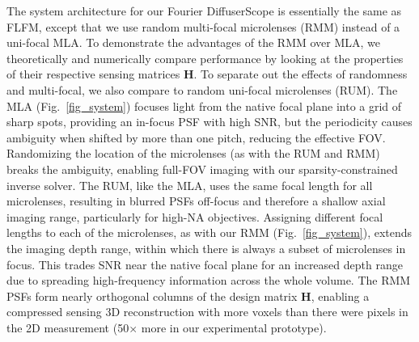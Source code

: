\documentclass{osa-article}
\begin{document}
The system architecture for our Fourier DiffuserScope is essentially the same as FLFM, except that we use random multi-focal microlenses (RMM) instead of a uni-focal MLA. To demonstrate the advantages of the RMM over MLA, we theoretically and numerically compare performance by looking at the properties of their respective sensing matrices $\mathbf{H}$. To separate out the effects of randomness and multi-focal, we also compare to random uni-focal microlenses (RUM). The MLA (Fig.~\ref{fig_system}) focuses light from the native focal plane into a grid of sharp spots, providing an in-focus PSF with high SNR, but the periodicity causes ambiguity when shifted by more than one pitch, reducing the effective FOV. Randomizing the location of the microlenses (as with the RUM and RMM) breaks the ambiguity, enabling full-FOV imaging with our sparsity-constrained inverse solver. The RUM, like the MLA, uses the same focal length for all microlenses, resulting in blurred PSFs off-focus and therefore a shallow axial imaging range, particularly for high-NA objectives. Assigning different focal lengths to each of the microlenses, as with our RMM (Fig.~\ref{fig_system}), extends the imaging depth range, within which there is always a subset of microlenses in focus. This trades SNR near the native focal plane for an increased depth range due to spreading high-frequency information across the whole volume. The RMM PSFs form nearly orthogonal columns of the design matrix $\mathbf{H}$, enabling a compressed sensing 3D reconstruction with more voxels than there were pixels in the 2D measurement (50$\times$ more in our experimental prototype). 

\end{document}
